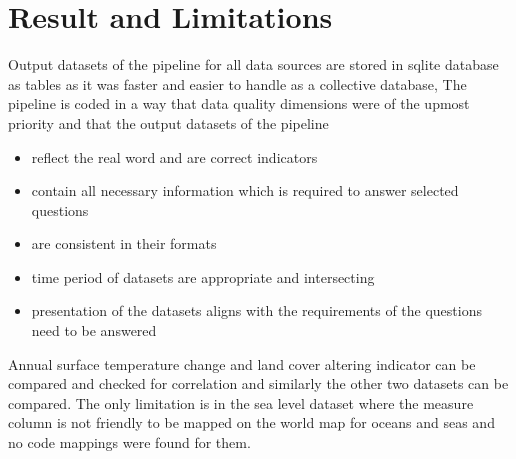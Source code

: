 \documentclass[a4paper,11pt]{article}
\begin{document}
\section{Result and Limitations}
Output datasets of the pipeline for all data sources are stored in sqlite database as tables as it was faster and easier to handle as a collective database, The pipeline is coded in a way that data quality dimensions were of the upmost priority and that the output datasets of the pipeline
\begin{itemize}
    \item reflect the real word and are correct indicators
    \item contain all necessary information which is required to answer selected questions
    \item are consistent in their formats
    \item time period of datasets are appropriate and intersecting
    \item presentation of the datasets aligns with the requirements of the questions need to be answered
\end{itemize}

Annual surface temperature change and land cover altering indicator can be compared and checked for correlation and similarly the other two datasets can be compared. The only limitation is in the sea level dataset where the measure column is not friendly to be mapped on the world map for oceans and seas and no code mappings were found for them.



\end{document}
